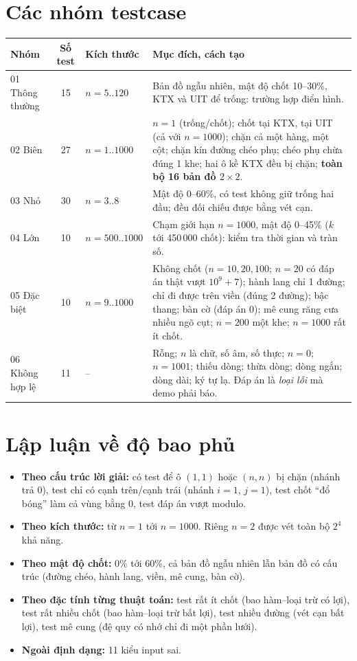 \documentclass[12pt,a4paper]{report}
\begin{document}
\section{Các nhóm testcase}
\begin{longtable}{p{2.6cm} c p{2.1cm} p{8.6cm}}
\toprule
\textbf{Nhóm} & \textbf{Số test} & \textbf{Kích thước} & \textbf{Mục đích, cách tạo}\\\midrule\endhead
01 Thông thường & 15 & $n=5..120$ & Bản đồ ngẫu nhiên, mật độ chốt 10--30\%, KTX và UIT để trống: trường hợp điển hình.\\\midrule
02 Biên & 27 & $n=1..1000$ & $n=1$ (trống/chốt); chốt tại KTX, tại UIT (cả với $n=1000$); chặn cả một hàng, một cột; chặn kín đường chéo phụ; chéo phụ chừa đúng 1 khe; hai ô kề KTX đều bị chặn; \textbf{toàn bộ 16 bản đồ $2\times2$}.\\\midrule
03 Nhỏ & 30 & $n=3..8$ & Mật độ 0--60\%, có test không giữ trống hai đầu; đều đối chiếu được bằng vét cạn.\\\midrule
04 Lớn & 10 & $n=500..1000$ & Chạm giới hạn $n=1000$, mật độ 0--45\% ($k$ tới 450\,000 chốt): kiểm tra thời gian và tràn số.\\\midrule
05 Đặc biệt & 10 & $n=9..1000$ & Không chốt ($n=10,20,100$; $n=20$ có đáp án thật vượt $10^9+7$); hành lang chỉ 1 đường; chỉ đi được trên viền (đúng 2 đường); bậc thang; bàn cờ (đáp án 0); mê cung răng cưa nhiều ngõ cụt; $n=200$ một khe; $n=1000$ rất ít chốt.\\\midrule
06 Không hợp lệ & 11 & -- & Rỗng; $n$ là chữ, số âm, số thực; $n=0$; $n=1001$; thiếu dòng; thừa dòng; dòng ngắn; dòng dài; ký tự lạ. Đáp án là \emph{loại lỗi} mà demo phải báo.\\
\bottomrule
\end{longtable}

\section{Lập luận về độ bao phủ}
\begin{itemize}
  \item \textbf{Theo cấu trúc lời giải:} có test để ô $(1,1)$ hoặc $(n,n)$ bị chặn (nhánh trả 0), test chỉ có cạnh trên/cạnh trái (nhánh $i=1$, $j=1$), test chốt ``đổ bóng'' làm cả vùng bằng 0, test đáp án vượt modulo.
  \item \textbf{Theo kích thước:} từ $n=1$ tới $n=1000$. Riêng $n=2$ được vét toàn bộ $2^4$ khả năng.
  \item \textbf{Theo mật độ chốt:} 0\% tới 60\%, cả bản đồ ngẫu nhiên lẫn bản đồ có cấu trúc (đường chéo, hành lang, viền, mê cung, bàn cờ).
  \item \textbf{Theo đặc tính từng thuật toán:} test rất ít chốt (bao hàm--loại trừ có lợi), test rất nhiều chốt (bao hàm--loại trừ bất lợi), test nhiều đường (vét cạn bất lợi), test mê cung (đệ quy có nhớ chỉ đi một phần lưới).
  \item \textbf{Ngoài định dạng:} 11 kiểu input sai.
\end{itemize}
\end{document}
